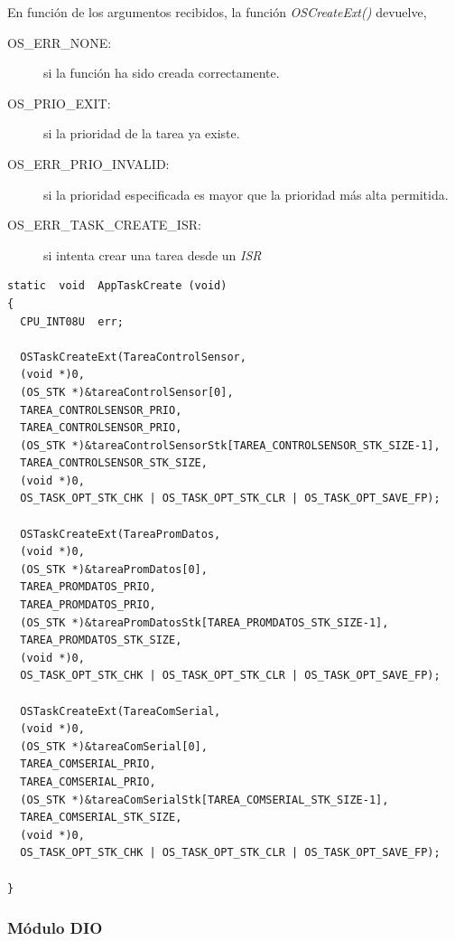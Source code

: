 \documentclass[11pt,a4paper,oneside]{article}
\begin{document}
En función de los argumentos recibidos, la función  \emph{OSCreateExt()} devuelve,
\begin{description}
\item[OS\_ERR\_NONE:] si la función ha sido creada correctamente.
\item[OS\_PRIO\_EXIT:] si la prioridad de la tarea ya existe.
\item[OS\_ERR\_PRIO\_INVALID:] si la prioridad especificada es mayor que la prioridad más alta permitida. 
\item[OS\_ERR\_TASK\_CREATE\_ISR:] si intenta crear una tarea desde un \emph{ISR}
\end{description}

\begin{lstlisting}[caption={Función de la tarea \emph{AppTaskCreate()}},label=code:creates-tasks]
static  void  AppTaskCreate (void)
{
  CPU_INT08U  err;
  
  OSTaskCreateExt(TareaControlSensor,
  (void *)0,
  (OS_STK *)&tareaControlSensor[0],
  TAREA_CONTROLSENSOR_PRIO,
  TAREA_CONTROLSENSOR_PRIO,
  (OS_STK *)&tareaControlSensorStk[TAREA_CONTROLSENSOR_STK_SIZE-1],
  TAREA_CONTROLSENSOR_STK_SIZE,
  (void *)0,
  OS_TASK_OPT_STK_CHK | OS_TASK_OPT_STK_CLR | OS_TASK_OPT_SAVE_FP);

  OSTaskCreateExt(TareaPromDatos,
  (void *)0,
  (OS_STK *)&tareaPromDatos[0],
  TAREA_PROMDATOS_PRIO,
  TAREA_PROMDATOS_PRIO,
  (OS_STK *)&tareaPromDatosStk[TAREA_PROMDATOS_STK_SIZE-1],
  TAREA_PROMDATOS_STK_SIZE,
  (void *)0,
  OS_TASK_OPT_STK_CHK | OS_TASK_OPT_STK_CLR | OS_TASK_OPT_SAVE_FP);

  OSTaskCreateExt(TareaComSerial,
  (void *)0,
  (OS_STK *)&tareaComSerial[0],
  TAREA_COMSERIAL_PRIO,
  TAREA_COMSERIAL_PRIO,
  (OS_STK *)&tareaComSerialStk[TAREA_COMSERIAL_STK_SIZE-1],
  TAREA_COMSERIAL_STK_SIZE,
  (void *)0,
  OS_TASK_OPT_STK_CHK | OS_TASK_OPT_STK_CLR | OS_TASK_OPT_SAVE_FP);

}
\end{lstlisting}

\subsubsection{Módulo DIO}
\label{sec:mod-dio}
\end{document}
